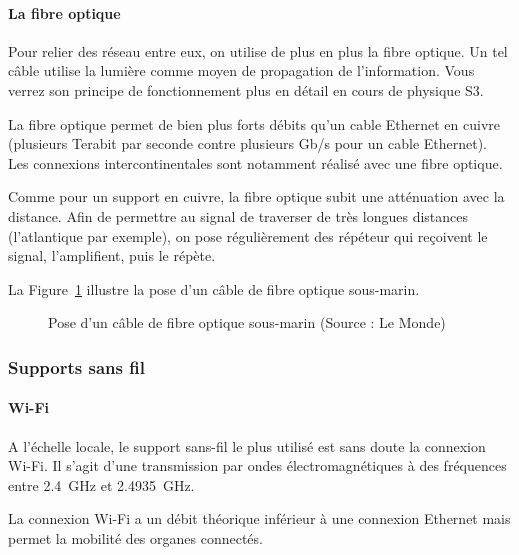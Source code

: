 
\paragraph{La fibre optique}
Pour relier des réseau entre eux, on utilise de plus en plus la fibre optique. Un tel câble utilise la lumière comme moyen de propagation de l'information. Vous verrez son principe de fonctionnement plus en détail en cours de physique S3.

La fibre optique permet de bien plus forts débits qu'un cable Ethernet en cuivre (plusieurs Terabit par seconde contre plusieurs Gb/s pour un cable Ethernet). Les connexions intercontinentales sont notamment réalisé avec une fibre optique.

Comme pour un support en cuivre, la fibre optique subit une atténuation avec la distance. Afin de permettre au signal de traverser de très longues distances (l'atlantique par exemple), on pose régulièrement des répéteur qui reçoivent le signal, l'amplifient, puis le répète.

La Figure~\ref{fig:poseFibre} illustre la pose d'un câble de fibre optique sous-marin.

\begin{figure}[h]
\centering
  
  \caption{Pose d'un câble de fibre optique sous-marin (Source : Le Monde)}
  \label{fig:poseFibre}
\end{figure}

\subsubsection{Supports sans fil}
\paragraph{Wi-Fi}
A l'échelle locale, le support sans-fil le plus utilisé est sans doute la connexion Wi-Fi. Il s'agit d'une transmission par ondes électromagnétiques à des fréquences entre \SI{2.4}{GHz} et \SI{2.4935}{GHz}.

La connexion Wi-Fi a un débit théorique inférieur à une connexion Ethernet mais permet la mobilité des organes connectés.
